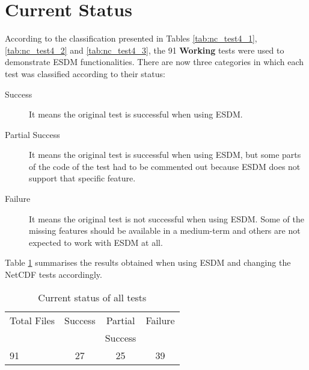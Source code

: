 \section{Current Status}

According to the classification presented in Tables \ref{tab:nc_test4_1}, \ref{tab:nc_test4_2} and \ref{tab:nc_test4_3}, the 91 {\bf Working} tests were used to demonstrate ESDM functionalities. There are now three categories in which each test was classified according to their status:

\begin{description}

\item[Success] It means the original test is successful when using ESDM.

\item[Partial Success] It means the original test is successful when using ESDM, but some parts of the code of the test had to be commented out because ESDM does not support that specific feature.


\item[Failure] It means the original test is not successful when using ESDM. Some of the missing features should be available in a medium-term and others are not expected to work with ESDM at all.


\end{description}

Table \ref{tab:nc_test4_status_3} summarises the results obtained when using ESDM and changing the NetCDF tests accordingly.

\begin{table}[H]
\centering
\begin{tabular}{|l|c|c|c|}
\hline
\multicolumn{1}{|c|}{Total Files} & \multicolumn{1}{c|}{Success} & \multicolumn{1}{c|}{Partial} & \multicolumn{1}{c|}{Failure} \\
                                  &                              & \multicolumn{1}{c|}{Success} &               \\ \hline \hline
91                                &     27                       &       25                     &       39      \\ \hline \hline
\end{tabular}
\caption{\label{tab:nc_test4_status_3} Current status of all tests}
\end{table}

